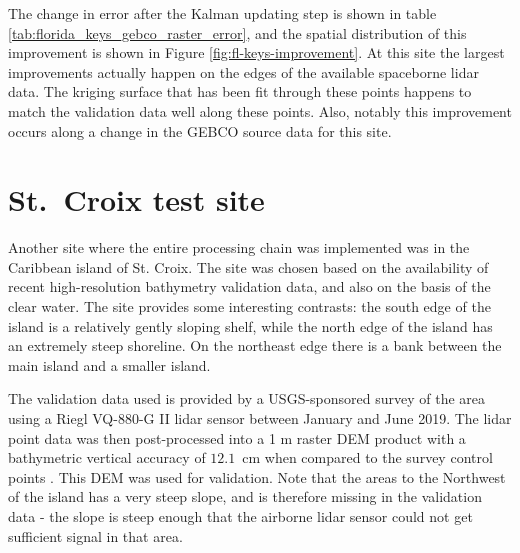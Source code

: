 The change in error after the Kalman updating step is shown in table \ref{tab:florida_keys_gebco_raster_error}, and the spatial distribution of this improvement is shown in Figure \ref{fig:fl-keys-improvement}. At this site the largest improvements actually happen on the edges of the available spaceborne lidar data. The kriging surface that has been fit through these points happens to match the validation data well along these points. Also, notably this improvement occurs along a change in the GEBCO source data for this site.

\begin{figure}[!ht]
    \begin{floatrow}
    \end{floatrow}
\end{figure}

\section{St.~Croix test site} \label{sec:stcroix-site}

Another site where the entire processing chain was implemented was in the Caribbean island of St. Croix. The site was chosen based on the availability of recent high-resolution bathymetry validation data, and also on the basis of the clear water. The site provides some interesting contrasts: the south edge of the island is a relatively gently sloping shelf, while the north edge of the island has an extremely steep shoreline. On the northeast edge there is a bank between the main island and a smaller island.

The validation data used is provided by a USGS-sponsored survey of the area using a Riegl VQ-880-G II lidar sensor between January and June 2019. The lidar point data was then post-processed into a 1 m raster DEM product with a bathymetric vertical accuracy of $12.1$~cm when compared to the survey control points \parencite{USVI-lidar2022}. This DEM was used for validation. Note that the areas to the Northwest of the island has a very steep slope, and is therefore missing in the validation data - the slope is steep enough that the airborne lidar sensor could not get sufficient signal in that area.

